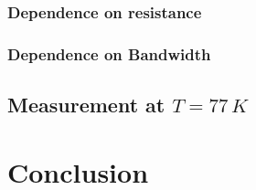 \subsubsection{Dependence on resistance}

\subsubsection{Dependence on Bandwidth}




\subsection{Measurement at $T=77 \, K$}








\section{Conclusion}





